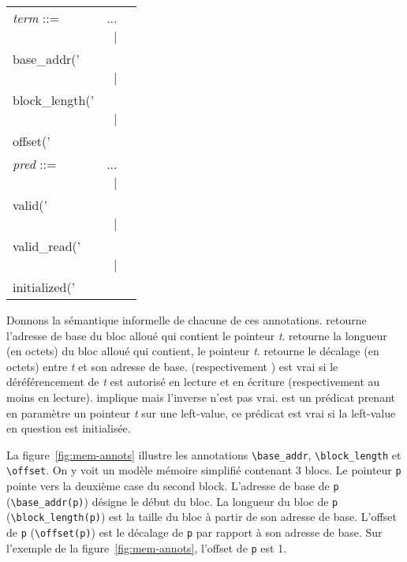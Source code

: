 \begin{center}
\begin{tabular}{lrl}
  \textit{term} ::= & ... \\
  & $\mid$
  & \underline{\lstinline'\\base_addr('} \textit{t} \underline{\lstinline')'} \\
  & $\mid$
  & \underline{\lstinline'\\block_length('} \textit{t} \underline{\lstinline')'} \\
  & $\mid$
  & \underline{\lstinline'\\offset('} \textit{t} \underline{\lstinline')'} \\
  \textit{pred} ::= & ... \\
  & $\mid$
  & \underline{\lstinline'\\valid('} \textit{t} \underline{\lstinline')'} \\
  & $\mid$
  & \underline{\lstinline'\\valid_read('} \textit{t} \underline{\lstinline')'} \\
  & $\mid$
  & \underline{\lstinline'\\initialized('} \textit{t} \underline{\lstinline')'} \\
\end{tabular}
\end{center}


Donnons la sémantique informelle de chacune de ces annotations.
\baseaddrt retourne l'adresse de base du bloc alloué qui contient le pointeur
\textit{t}.
\blocklengtht retourne la longueur (en octets) du bloc alloué qui contient, le
pointeur \textit{t}.
\offsett retourne le décalage (en octets) entre \textit{t} et son adresse de
base.
\validt (respectivement \validreadt) est vrai si le déréférencement de
\textit{t} est autorisé en lecture et en écriture (respectivement au moins en
lecture).
\validt implique \validreadt mais l'inverse n'est pas vrai.
\initializedt est un prédicat prenant en paramètre un pointeur \textit{t} sur
une left-value, ce prédicat est vrai si la left-value en question est
initialisée.





La figure~\ref{fig:mem-annots} illustre les annotations \lstinline{\base_addr},
\lstinline{\block_length} et \lstinline{\offset}.
On y voit un modèle mémoire simplifié contenant 3 blocs.
Le pointeur \lstinline'p' pointe vers la deuxième case du second block.
L'adresse de base de \lstinline'p' (\lstinline'\base_addr(p)') désigne le
début du bloc.
La longueur du bloc de \lstinline'p' (\lstinline'\block_length(p)') est la
taille du bloc à partir de son adresse de base.
L'offset de \lstinline'p' (\lstinline'\offset(p)') est le décalage de
\lstinline'p' par rapport à son adresse de base.
Sur l'exemple de la figure~\ref{fig:mem-annots}, l'offset de \lstinline'p' est
1.


